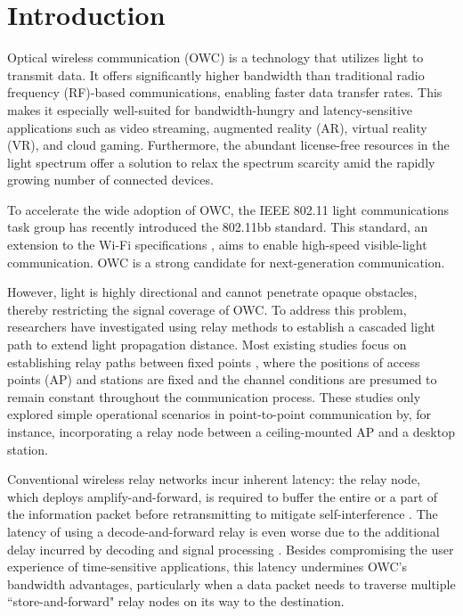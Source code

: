 \section{Introduction}
Optical wireless communication (OWC) is a technology that utilizes light to transmit data. It offers significantly higher bandwidth than traditional radio frequency (RF)-based communications, enabling faster data transfer rates. This makes it especially well-suited for bandwidth-hungry and latency-sensitive applications such as video streaming, augmented reality (AR), virtual reality (VR), and cloud gaming. Furthermore, the abundant license-free resources in the light spectrum offer a solution to relax the spectrum scarcity amid the rapidly growing number of connected devices.
\par
To accelerate the wide adoption of OWC, the IEEE 802.11 light communications task group has recently introduced the 802.11bb standard. This standard, an extension to the Wi-Fi specifications \cite{10063242}, aims to enable high-speed visible-light communication.
OWC is a strong candidate for next-generation communication.
\par
However, light is highly directional and cannot penetrate opaque obstacles, thereby restricting the signal coverage of OWC. To address this problem, researchers have investigated using relay methods to establish a cascaded light path to extend light propagation distance. Most existing studies focus on establishing relay paths between fixed points \cite{7180320, 7193338, 7934349, 8761986, 9266077}, where the positions of access points (AP) and stations are fixed and the channel conditions are presumed to remain constant throughout the communication process. These studies only explored simple operational scenarios in point-to-point communication by, for instance, incorporating a relay node between a ceiling-mounted AP and a desktop station.
\par
Conventional wireless relay networks incur inherent latency: the relay node, which deploys amplify-and-forward, is required to buffer the entire or a part of the information packet before retransmitting to mitigate self-interference \cite{6089444, marzban2022securing, 4531911, 4525814, 6735588}. The latency of using a decode-and-forward relay is even worse due to the additional delay incurred by decoding and signal processing \cite{al2017cognitive, 4273702, al2016decoding}. Besides compromising the user experience of time-sensitive applications, this latency undermines OWC's bandwidth advantages, particularly when a data packet needs to traverse multiple “store-and-forward" relay nodes on its way to the destination. 
